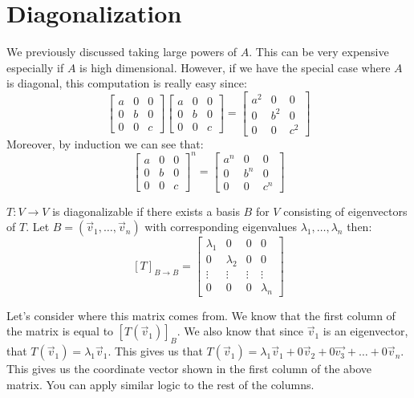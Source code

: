 \section{Diagonalization}
We previously discussed taking large powers of $A$. This can be very expensive especially if $A$ is high dimensional. However, if we have the special case where $A$ is diagonal, this computation is really easy since:
$$\begin{bmatrix}
    a & 0 & 0\\
    0 & b & 0\\
    0 & 0 & c
\end{bmatrix}\begin{bmatrix}
    a & 0 & 0\\
    0 & b & 0\\
    0 & 0 & c
\end{bmatrix}=\begin{bmatrix}
    a^2 & 0 & 0\\
    0 & b^2 & 0\\
    0 & 0 & c^2
\end{bmatrix}$$
Moreover, by induction we can see that:
$$\begin{bmatrix}
    a & 0 & 0\\
    0 & b & 0\\
    0 & 0 & c
\end{bmatrix}^n=\begin{bmatrix}
    a^n & 0 & 0\\
    0 & b^n & 0\\
    0 & 0 & c^n
\end{bmatrix}$$
\begin{definition}
    $T:V\to V$ is diagonalizable if there exists a basis $B$ for $V$ consisting of eigenvectors of $T$. Let $B=(\vec{v}_1,\ldots,\vec{v}_n)$ with corresponding eigenvalues $\lambda_1,\ldots,\lambda_n$ then:
    $$[T]_{B\to B}=\begin{bmatrix}
        \lambda_1 & 0 & 0 & 0\\
        0 & \lambda_2 & 0 & 0\\
        \vdots & \vdots & \vdots & \vdots\\
        0 & 0 & 0 & \lambda_n
    \end{bmatrix}$$
\end{definition}
Let's consider where this matrix comes from. We know that the first column of the matrix is equal to $[T(\vec{v}_1)]_B$. We also know that since $\vec{v}_1$ is an eigenvector, that $T(\vec{v}_1)=\lambda_1\vec{v}_1$. This gives us that $T(\vec{v}_1)=\lambda_1\vec{v}_1+0\vec{v}_2+0\vec{v_3}+\ldots+0\vec{v}_n$. This gives us the coordinate vector shown in the first column of the above matrix. You can apply similar logic to the rest of the columns.

